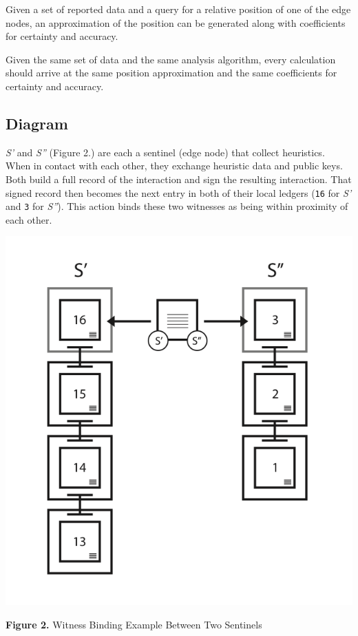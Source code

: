 \documentclass{article}
\begin{document}
Given a set of reported data and a query for a relative position of one of the edge nodes, an approximation of the position can be generated along with coefficients for certainty and accuracy.

Given the same set of data and the same analysis algorithm, every calculation should arrive at the same position approximation and the same coefficients for certainty and accuracy.

\subsection {Diagram}
\textit{S'} and \textit{S''} (Figure 2.) are each a \Gls{sentinel} (edge node) that collect \glspl{heuristic}. When in contact with each other, they exchange heuristic data and public keys. Both build a full record of the interaction and sign the resulting interaction. That signed record then becomes the next entry in both of their local ledgers (\texttt{16} for \textit{S'} and \texttt{3} for \textit{S''}). This action binds these two witnesses as being within proximity of each other.

\includegraphics [width=\textwidth]{boundwitness}
\begin{center}\textbf{Figure 2.}  Witness Binding Example Between Two Sentinels
\end{center}
\end{document}
